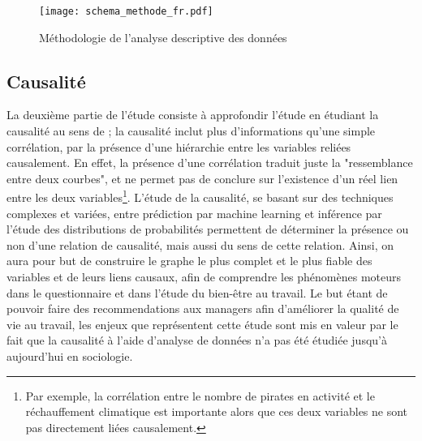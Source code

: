 \documentclass[11pt,fleqn,openany,frenchb]{book} %
\begin{document}
\begin{figure}[!h]
  \centering
  \texttt{[image: schema\_methode\_fr.pdf]}
  \caption{Méthodologie de l'analyse descriptive des données}
  \label{fig:metho}
\end{figure}

\subsection{Causalité}
La deuxième partie de l'étude consiste à approfondir l'étude en
étudiant la causalité au sens de \cite{granger1969causality} ; la
causalité inclut plus d'informations qu'une simple corrélation, par la
présence d'une hiérarchie entre les variables reliées causalement. En
effet, la présence d'une corrélation traduit juste la "ressemblance
entre deux courbes", et ne permet pas de conclure sur l'existence d'un
réel lien entre les deux variables\footnote{Par exemple, la
  corrélation entre le nombre de pirates en activité et le
  réchauffement climatique est importante alors que ces deux variables
  ne sont pas directement liées causalement.}. L'étude de la
causalité, se basant sur des techniques complexes et variées, entre
prédiction par machine learning et inférence par l'étude des
distributions de probabilités permettent de déterminer la présence ou
non d'une relation de causalité, mais aussi du sens de cette
relation. Ainsi, on aura pour but de construire le graphe le plus
complet et le plus fiable des variables et de leurs liens causaux,
afin de comprendre les phénomènes moteurs dans le questionnaire et
dans l'étude du bien-être au travail. Le but étant de pouvoir faire
des recommendations aux managers afin d'améliorer la qualité de vie au
travail, les enjeux que représentent cette étude sont mis en valeur
par le fait que la causalité à l'aide d'analyse de données n'a pas été
étudiée jusqu'à aujourd'hui en sociologie. \par %

\end{document}
